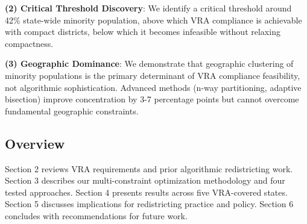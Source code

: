 \textbf{(2) Critical Threshold Discovery}: We identify a critical threshold around 42\% state-wide minority population, above which VRA compliance is achievable with compact districts, below which it becomes infeasible without relaxing compactness.

\textbf{(3) Geographic Dominance}: We demonstrate that geographic clustering of minority populations is the primary determinant of VRA compliance feasibility, not algorithmic sophistication. Advanced methods (n-way partitioning, adaptive bisection) improve concentration by 3-7 percentage points but cannot overcome fundamental geographic constraints.

\subsection{Overview}

Section 2 reviews VRA requirements and prior algorithmic redistricting work. Section 3 describes our multi-constraint optimization methodology and four tested approaches. Section 4 presents results across five VRA-covered states. Section 5 discusses implications for redistricting practice and policy. Section 6 concludes with recommendations for future work.
